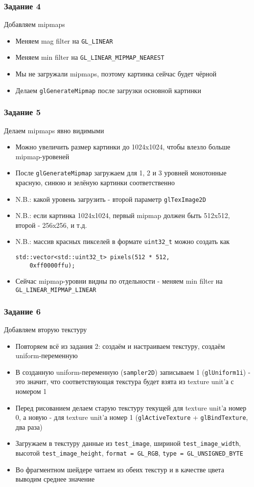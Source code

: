 \documentclass{beamer}
\begin{document}
\begin{frame}[fragile]
\frametitle{Задание 4}
Добавляем mipmaps
\begin{itemize}
\item Меняем mag filter на \verb|GL_LINEAR|
\pause
\item Меняем min filter на \verb|GL_LINEAR_MIPMAP_NEAREST|
\pause
\item Мы не загружали mipmaps, поэтому картинка сейчас будет чёрной
\pause
\item Делаем \verb|glGenerateMipmap| после загрузки основной картинки
\end{itemize}
\end{frame}

\begin{frame}[fragile]
\frametitle{Задание 5}
Делаем mipmaps явно видимыми
\begin{itemize}
\item Можно увеличить размер картинки до 1024x1024, чтобы влезло больше mipmap-уровеней
\pause
\item После \verb|glGenerateMipmap| загружаем для 1, 2 и 3 уровней монотонные красную, синюю и зелёную картинки соответственно
\pause
\item N.B.: какой уровень загрузить - второй параметр \verb|glTexImage2D|
\pause
\item N.B.: если картинка 1024x1024, первый mipmap должен быть 512x512, второй - 256x256, и т.д.
\pause
\item N.B.: массив красных пикселей в формате \verb|uint32_t| можно создать как
\begin{verbatim}
std::vector<std::uint32_t> pixels(512 * 512,
    0xff0000ffu);
\end{verbatim}
\pause
\item Сейчас mipmap-уровни видны по отдельности - меняем min filter на \verb|GL_LINEAR_MIPMAP_LINEAR|
\end{itemize}
\end{frame}

\begin{frame}[fragile]
\frametitle{Задание 6}
Добавляем вторую текстуру
\begin{itemize}
\item Повторяем всё из задания 2: создаём и настраиваем текстуру, создаём uniform-переменную
\pause
\item В созданную uniform-переменную (\verb|sampler2D|) записываем 1 (\verb|glUniform1i|) - это значит, что соответствующая текстура будет взята из texture unit'а с номером 1
\pause
\item Перед рисованием делаем старую текстуру текущей для texture unit'а номер 0, а новую - для texture unit'а номер 1 (\verb|glActiveTexture| + \verb|glBindTexture|, два раза)
\pause
\item Загружаем в текстуру данные из \verb|test_image|, шириной \verb|test_image_width|, высотой \verb|test_image_height|, \verb|format = GL_RGB|, \verb|type = GL_UNSIGNED_BYTE|
\pause
\item Во фрагментном шейдере читаем из обеих текстур и в качестве цвета выводим среднее значение
\end{itemize}
\end{frame}
\end{document}
